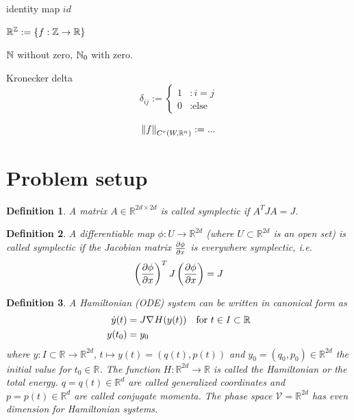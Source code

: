 \documentclass[twoside,a4paper]{article}
\newtheorem{definition}{Definition}
\begin{document}
identity map $id$

$\mathbb{R}^{\mathbb{Z}} := \{ f : \mathbb{Z} \to \mathbb{R} \}$

$\mathbb{N}$ without zero, $\mathbb{N}_0$ with zero.

Kronecker delta
\begin{equation*}
	\delta_{ij} := \begin{cases}
		1 &: i = j \\
		0 &: \text{else}
	\end{cases}
\end{equation*}

\begin{equation*}
	\left\lVert{f}\right\rVert_{C^r(W,\mathbb{R}^n)} := ...
\end{equation*}


%
%
\newpage
\section{Problem setup}

\begin{definition}
	A matrix $A \in \mathbb{R}^{2d \times 2d}$ is called symplectic if $A^TJA=J$.
\end{definition}

\begin{definition}
	A differentiable map $\phi : U \to \mathbb{R}^{2d}$ (where $U \subset \mathbb{R}^{2d}$ is an open set)
	is called symplectic if the Jacobian matrix $\frac{\partial \phi}{\partial x}$ is everywhere symplectic, i.e.
	\begin{equation*}
		\left( \frac{\partial \phi}{\partial x} \right)^T J \left( \frac{\partial \phi}{\partial x} \right) = J
	\end{equation*}
\end{definition}

\begin{definition}
	A Hamiltonian (ODE) system can be written in canonical form as
	\begin{align*}
		\dot{y}(t) &= J \nabla_{}{H}(y(t)) \quad \text{for } t \in I \subset \mathbb{R} \\
		y(t_0) &= y_0
	\end{align*}
	where $y: I \subset \mathbb{R} \to \mathbb{R}^{2d},\, t \mapsto y(t) = (q(t),p(t))$ and 
	$y_0 = (q_0, p_0) \in \mathbb{R}^{2d}$ the initial value for $t_0 \in \mathbb{R}$. 
	The function $H: \mathbb{R}^{2d} \to \mathbb{R}$ is called the Hamiltonian 
	or the total energy. $q = q(t) \in \mathbb{R}^d$ are called generalized coordinates
	and $p=p(t) \in \mathbb{R}^d$ are called conjugate momenta. 
	The phase space $\mathcal{V} = \mathbb{R}^{2d}$ has even dimension for Hamiltonian systems.
\end{definition}
\end{document}
